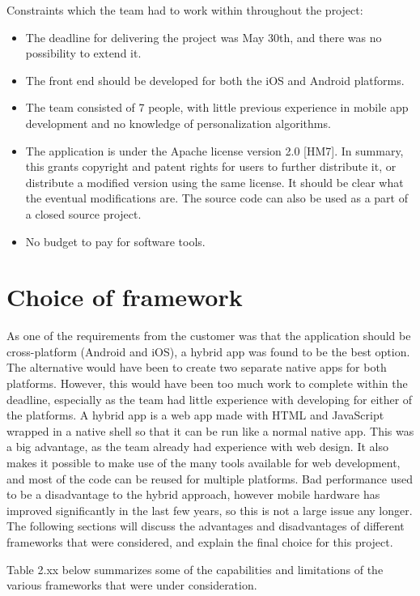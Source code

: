 Constraints which the team had to work within throughout the project:
\begin{itemize}
\item The deadline for delivering the project was May 30th, and there was no possibility to extend it.
\item The front end should be developed for both the iOS and Android platforms.
\item The team consisted of 7 people, with little previous experience in mobile app development and no knowledge of personalization algorithms.
\item The application is under the Apache license version 2.0 [HM7]. In summary, this grants copyright and patent rights for users to further distribute it, or distribute a modified version using the same license. It should be clear what the eventual modifications are. The source code can also be used as a part of a closed source project.
\item No budget to pay for software tools.
\end{itemize}

\section{Choice of framework}

As one of the requirements from the customer was that the application should be cross-platform (Android and iOS), a hybrid app was found to be the best option. The alternative would have been to create two separate native apps for both platforms. However, this would have been too much work to complete within the deadline, especially as the team had little experience with developing for either of the platforms. A hybrid app is a web app made with HTML and JavaScript wrapped in a native shell so that it can be run like a normal native app. This was a big advantage, as the team already had experience with web design. It also makes it possible to make use of the many tools available for web development, and most of the code can be reused for multiple platforms. Bad performance used to be a disadvantage to the hybrid approach, however mobile hardware has improved significantly in the last few years, so this is not a large issue any longer. The following sections will discuss the advantages and disadvantages of different frameworks that were considered, and explain the final choice for this project. 

Table 2.xx below summarizes some of the capabilities and limitations of the various frameworks that were under consideration.

